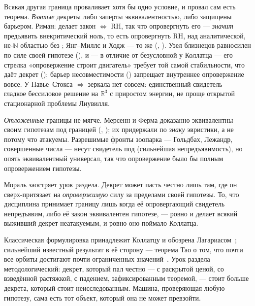 Всякая другая граница проваливает хотя бы одно условие, и провал сам есть теорема. \emph{Взятые} декреты либо заперты
эквивалентностью, либо защищены барьером. Риман:  делает закон
$\Leftrightarrow$ RH, так что опровергнуть его --- \emph{значит} предъявить внекритический ноль, то есть опровергнуть RH,
над аналитической, не-$\mathbb{N}$ областью без ; Янг--Миллс и Ходж --- то же
(, ). Узел близнецов равносилен по силе своей
гипотезе (), и --- в отличие от безусловной у Коллатца
 --- его стрелка «опровержение строит двигатель» требует той самой
стабильности, что даёт декрет (); барьер несовместимости
() запрещает внутреннее опровержение вовсе. У Навье--Стокса $\Leftrightarrow$-зеркала
нет совсем: единственный свидетель --- гладкое бессиловое решение на $\mathbb{R}^3$ с приростом энергии, не проще открытой
стационарной проблемы Лиувилля.

\emph{Отложенные} границы не мягче. Мерсенн и Ферма доказанно эквивалентны своим гипотезам под границей
(, );
их придержали по \emph{знаку} эвристики, а не потому что атакуемы. Разрешимые фронты зоопарка --- Гольдбах, Лежандр,
совершенные числа --- несут свидетель под  (сильнейшая непредъявимость), но опять эквивалентный универсал, так
что опровержение было бы полным опровержением гипотезы.

Мораль заостряет урок раздела. Декрет может пасть честно лишь там, где он сверх-притязает на \emph{опровержимую} силу за
пределами своей гипотезы. То, что дисциплина принимает границу лишь когда её опровергающий свидетель непредъявим, либо её
закон эквивалентен гипотезе, --- ровно и делает всякий выживший декрет неатакуемым, и ровно оно поймало Коллатца.

Классическая формулировка принадлежит Коллатцу и обозрена Лагариасом~\cite{lagarias1985,lagarias2010}; сильнейший известный результат в её сторону --- теорема Тао о том, что почти все орбиты достигают почти ограниченных значений~\cite{tao2022}.
Урок раздела методологический: декрет, который пал честно --- с раскрытой ценой, со взведённой
растяжкой, с падением, зафиксированным теоремой, --- стоит больше декрета, который стоит
неисследованным. Машина, проверяющая любую гипотезу, сама есть тот объект, который она не может
превзойти.
